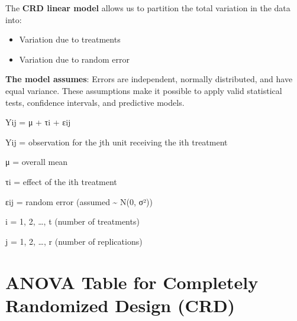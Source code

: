 \documentclass[
  letterpaper,
  DIV=11,
  numbers=noendperiod]{scrartcl}
\begin{document}
The \textbf{CRD linear model} allows us to partition the total variation
in the data into:

\begin{itemize}
\item
  Variation due to treatments
\item
  Variation due to random error
\end{itemize}

\textbf{The model assumes}: Errors are independent, normally
distributed, and have equal variance. These assumptions make it possible
to apply valid statistical tests, confidence intervals, and predictive
models.

\begin{tcolorbox}[enhanced jigsaw, titlerule=0mm, title={\textbf{CRD Linear Model}}, bottomrule=.15mm, colback=white, opacityback=0, rightrule=.15mm, colframe=quarto-callout-tip-color-frame, toprule=.15mm, toptitle=1mm, leftrule=.75mm, left=2mm, arc=.35mm, breakable, coltitle=black, bottomtitle=1mm, colbacktitle=quarto-callout-tip-color!10!white, opacitybacktitle=0.6]

Yij = μ + τi + εij

\end{tcolorbox}

Yij = observation for the jth unit receiving the ith treatment

μ = overall mean

τi = effect of the ith treatment

εij = random error (assumed \textasciitilde{} N(0, σ²))

i = 1, 2, \ldots, t (number of treatments)

j = 1, 2, \ldots, r (number of replications)

\begin{tcolorbox}[enhanced jigsaw, titlerule=0mm, title=\textcolor{quarto-callout-tip-color}{\faLightbulb}\hspace{0.5em}{Without the mathematical model, we couldn't formally test or compare
treatments reliably.}, bottomrule=.15mm, colback=white, opacityback=0, rightrule=.15mm, colframe=quarto-callout-tip-color-frame, toprule=.15mm, toptitle=1mm, leftrule=.75mm, left=2mm, arc=.35mm, breakable, coltitle=black, bottomtitle=1mm, colbacktitle=quarto-callout-tip-color!10!white, opacitybacktitle=0.6]

\end{tcolorbox}

\hypertarget{anova-table-for-completely-randomized-design-crd}{%
\section{ANOVA Table for Completely Randomized Design
(CRD)}\label{anova-table-for-completely-randomized-design-crd}}
\end{document}
